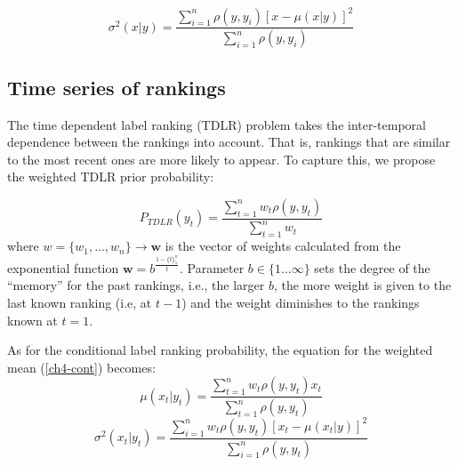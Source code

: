 \begin{equation}
\label{ch4-eq:sigma}
\sigma^2(x|y)=\frac{\sum_{i=1}^n \rho(y,y_i) [x-\mu(x|y)]^2}{\sum_{i=1}^n \rho(y,y_i)}
\end{equation}

\subsection{Time series of rankings}
The time dependent label ranking (TDLR) problem  takes the inter-temporal dependence between the rankings into account. That is, rankings that are similar to the most recent ones are more likely to appear. %
To capture this, we propose the weighted TDLR prior probability:

\begin{equation}
P_{TDLR}(y_t) =\frac{\sum_{t=1}^{n}  w_t \rho(y,y_t)}{ \sum_{t=1}^{n} w_t  }
\label{ch4-eq:timing}
\end{equation}
where $w = \{w_1, \ldots, w_{n}\} \rightarrow \mathbf{w}$  is the vector of weights calculated from the exponential function $\mathbf{w}=b ^{\frac{1-\{t\}_{1}^n }{t}}$. Parameter $b \in  \{1 \ldots \infty\}$ sets the degree of the ``memory'' for the past rankings, i.e.,  the larger $b$, the more weight is given to the last known ranking (i.e, at $t-1$)  and the weight diminishes to the rankings known at $t=1$. %

As for the conditional label ranking probability, the equation for the weighted mean (\ref{ch4-cont}) becomes:
\begin{equation}
\label{ch4-mu.w}
\mu(x_{t}|y_t) = \frac{\sum_{t=1}^n  w_t \rho(y,y_t) x_{t}}{\sum_{t=1}^n \rho(y,y_t)}
\end{equation}
\begin{equation}
\label{ch4-sigma}
\sigma^2(x_{t}|y_t)=\frac{\sum_{i=1}^n w_{t} \rho(y,y_t) [x_{t}-\mu(x_{t}|y)]^2}{\sum_{i=1}^n \rho(y,y_t)}
\end{equation}
